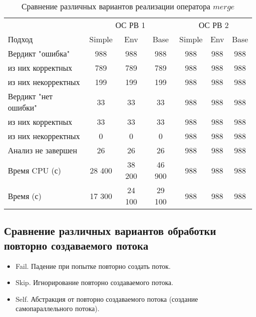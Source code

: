 \begin{center}
  \begin{table}[h]\footnotesize
  	\label{table-os-thread}
    \caption{Сравнение различных вариантов реализации оператора $merge$}
    \begin{tabular}{ | l | c | c | c | c | c | c |}
      \hline
      		& 		\multicolumn{3}{|c|}{ОС РВ 1} & \multicolumn{3}{|c|}{ОС РВ 2} \\
      Подход         				& Simple 	& Env 	& Base 	& Simple 	& Env 	& Base 		\\ \hline
      Вердикт "ошибка" 				& 988    	& 988   & 988   & 988       & 988   & 988  		\\ 
  \hspace{0.5cm} из них корректных 	& 789 		& 789 	& 789   & 988       & 988   & 988  		\\ 
  \hspace{0.5cm} из них некорректных & 199 		& 199 	& 199   & 988       & 988   & 988  		\\ \hline
      Вердикт "нет ошибки"  		& 33      	& 33    & 33    & 988       & 988  	& 988  		\\ 
  \hspace{0.5cm} из них корректных 	& 33 		& 33    & 33    & 988       & 988   & 988   	\\
  \hspace{0.5cm} из них некорректных & 0 		& 0    	& 0     & 988       & 988   & 988   	\\ \hline
      Анализ не завершен       		& 26     	& 26    & 26    & 988       & 988   & 988    	\\ \hline
      Время CPU (с)   				& 28 400 	& 38 200 & 46 900 & 988     & 988   & 988   	\\ 
      Время (с)  					& 17 300 	& 24 100 & 29 100 & 988     & 988 	& 988    	\\
      \hline
    \end{tabular}
  \end{table}
\end{center}

\subsection{Сравнение различных вариантов обработки повторно создаваемого потока }

\begin{itemize}
\item Fail. Падение при попытке повторно создать поток.
\item Skip. Игнорирование повторно создаваемого потока.
\item Self. Абстракция от повторно создаваемого потока (создание самопараллельного потока).
\end{itemize}

